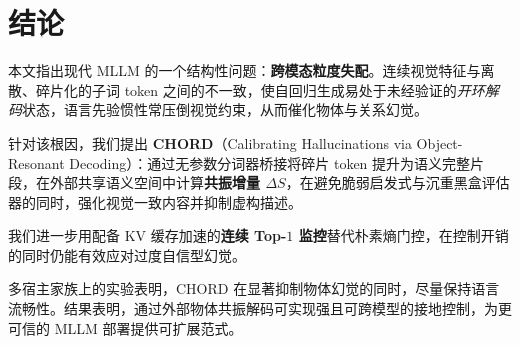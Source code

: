 \section{结论}
\label{sec:conclusion}

本文指出现代 MLLM 的一个结构性问题：\textbf{跨模态粒度失配}。连续视觉特征与离散、碎片化的子词 token 之间的不一致，使自回归生成易处于未经验证的\emph{开环解码}状态，语言先验惯性常压倒视觉约束，从而催化物体与关系幻觉。

针对该根因，我们提出 \textbf{CHORD}（Calibrating Hallucinations via Object-Resonant Decoding）：通过无参数分词器桥接将碎片 token 提升为语义完整片段，在外部共享语义空间中计算\textbf{共振增量 $\Delta S$}，在避免脆弱启发式与沉重黑盒评估器的同时，强化视觉一致内容并抑制虚构描述。

我们进一步用配备 KV 缓存加速的\textbf{连续 Top-$1$ 监控}替代朴素熵门控，在控制开销的同时仍能有效应对过度自信型幻觉。

多宿主家族上的实验表明，CHORD 在显著抑制物体幻觉的同时，尽量保持语言流畅性。结果表明，通过外部物体共振解码可实现强且可跨模型的接地控制，为更可信的 MLLM 部署提供可扩展范式。

